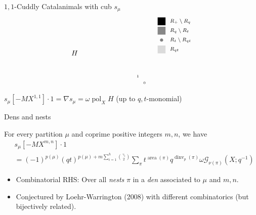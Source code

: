 \documentclass{beamer}
\DeclareMathOperator{\area}{area}
\DeclareMathOperator{\dinv}{dinv}
\newcommand{\Gcal}{\mathcal{G}}
\DeclareMathOperator{\pol}{pol}
\newcommand{\mymidgray}{black!47}  %
\newcounter{c}
\begin{document}
\begin{frame}{\(1,1\)-Cuddly Catalanimals with cub \(s_\mu\)}
\[\begin{array}{cr}
\begin{tikzpicture}[scale = .33]
\begin{scope}
\node (vv) at (19/2,-19/2) {\tiny $1 $};
\node at (21/2,-21/2) {\tiny $0 $};
\node at (0,-6) {\(H\)};
\end{scope}
\end{tikzpicture}&
\raisebox{16mm}{
\begin{tikzpicture}[scale = .39]
\begin{scope}
\draw[draw = none, fill = black!100] (2,-1) rectangle (3,-2);
\node[anchor = west] at (3,-1.5) {\scriptsize  \  $R_+ \setminus R_q$};
\end{scope}
\begin{scope}[yshift = -34*1]
\draw[draw = none, fill = \mymidgray] (2,-1) rectangle (3,-2);
\node[anchor = west] at (3,-1.5) {\scriptsize  \  $R_q \setminus R_t$};
\end{scope}
\begin{scope}[yshift = -34*2]
\draw[thin, black!0] (2,-1) -- (3,-1);
\draw[thin, black!0] (2,-1) -- (2,-2);
\draw[thin, black!0] (2,-2) -- (3,-2);
\draw[thin, black!0] (3,-2) -- (3,-1);
\draw[draw = none, fill = gray!100] (2+0.5, -1-0.5) circle (.2);
\node[anchor = west] at (3,-1.5) {\scriptsize  \  $R_t \setminus R_{qt}$};
\end{scope}
\begin{scope}[yshift = -34*3]
\draw[draw = none, fill = black!14] (2,-1) rectangle (3,-2);
\node[anchor = west] at (3,-1.5) {\scriptsize \  $R_{qt}$};
\end{scope}
\end{tikzpicture}}
    \end{array}
  \]
\(s_\mu[-MX^{1,1}] \cdot 1 = \nabla s_\mu = \omega\pol_X H\) (up to
\(q,t\)-monomial)
\end{frame}
\begin{frame}{Dens and nests}
  \begin{theorem}
    For every partition \(\mu\) and coprime positive integers \(m,n\),
    we have 
    \begin{align*}
      & s_\mu[-MX^{m,n}] \cdot 1 \\ & = (-1)^{p(\mu)}
      (qt)^{p(\mu)+m \sum_{i=1}^h \binom{\gamma_i}{2}}\sum_\pi t^{\area(\pi)}
      q^{\dinv_p(\pi)} \omega \Gcal_{\nu(\pi)}(X;q^{-1})
    \end{align*}
  \end{theorem}
  \begin{itemize}
  \item Combinatorial RHS: Over all \emph{nests} \(\pi\) in a
    \emph{den} associated to \(\mu\) and \(m,n\).\pause
  \item Conjectured by Loehr-Warrington (2008) with different
    combinatorics (but bijectively related).
  \end{itemize}
\end{frame}
\end{document}
